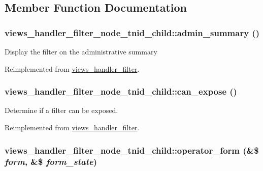 \subsection{Member Function Documentation}
\hypertarget{classviews__handler__filter__node__tnid__child_3762760577c3801276a683271be90e47}{
\subsubsection[{admin\_\-summary}]{\setlength{\rightskip}{0pt plus 5cm}views\_\-handler\_\-filter\_\-node\_\-tnid\_\-child::admin\_\-summary ()}}
\label{classviews__handler__filter__node__tnid__child_3762760577c3801276a683271be90e47}


Display the filter on the administrative summary 

Reimplemented from \hyperlink{classviews__handler__filter_655263cd0b73188eec064b9a9743fe4c}{views\_\-handler\_\-filter}.\hypertarget{classviews__handler__filter__node__tnid__child_2c6527f01666eaf0ba38eff4798ec732}{
\subsubsection[{can\_\-expose}]{\setlength{\rightskip}{0pt plus 5cm}views\_\-handler\_\-filter\_\-node\_\-tnid\_\-child::can\_\-expose ()}}
\label{classviews__handler__filter__node__tnid__child_2c6527f01666eaf0ba38eff4798ec732}


Determine if a filter can be exposed. 

Reimplemented from \hyperlink{classviews__handler__filter_f0e5810a2a2f194cd6af0fca9c858756}{views\_\-handler\_\-filter}.\hypertarget{classviews__handler__filter__node__tnid__child_e0cfa82e361de74d4f24f820f5106117}{
\subsubsection[{operator\_\-form}]{\setlength{\rightskip}{0pt plus 5cm}views\_\-handler\_\-filter\_\-node\_\-tnid\_\-child::operator\_\-form (\&\$ {\em form}, \/  \&\$ {\em form\_\-state})}}
\label{classviews__handler__filter__node__tnid__child_e0cfa82e361de74d4f24f820f5106117}


